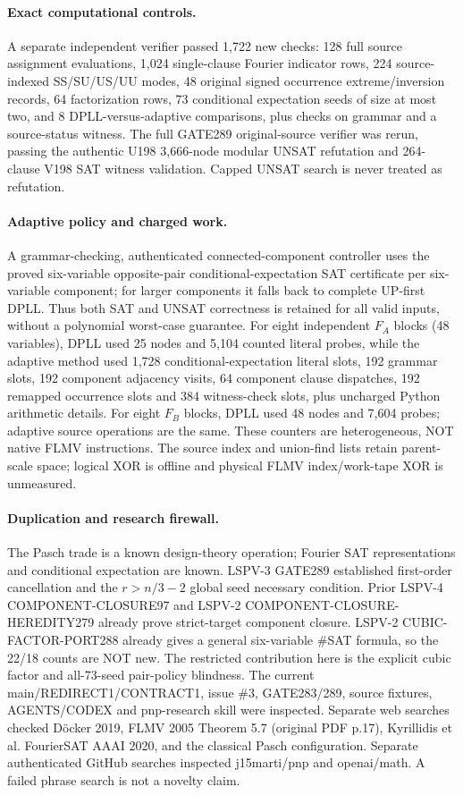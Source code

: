 \documentclass[11pt]{article}
\begin{document}
\paragraph{Exact computational controls.}
A separate independent verifier passed 1,722 new checks: 128 full source assignment evaluations, 1,024 single-clause Fourier indicator rows, 224 source-indexed SS/SU/US/UU modes, 48 original signed occurrence extreme/inversion records, 64 factorization rows, 73 conditional expectation seeds of size at most two, and 8 DPLL-versus-adaptive comparisons, plus checks on grammar and a source-status witness. The full GATE289 original-source verifier was rerun, passing the authentic U198 3,666-node modular UNSAT refutation and 264-clause V198 SAT witness validation. Capped UNSAT search is never treated as refutation.
\paragraph{Adaptive policy and charged work.}
A grammar-checking, authenticated connected-component controller uses the proved six-variable opposite-pair conditional-expectation SAT certificate per six-variable component; for larger components it falls back to complete UP-first DPLL. Thus both SAT and UNSAT correctness is retained for all valid inputs, without a polynomial worst-case guarantee. For eight independent $F_A$ blocks (48 variables), DPLL used 25 nodes and 5,104 counted literal probes, while the adaptive method used 1,728 conditional-expectation literal slots, 192 grammar slots, 192 component adjacency visits, 64 component clause dispatches, 192 remapped occurrence slots and 384 witness-check slots, plus uncharged Python arithmetic details. For eight $F_B$ blocks, DPLL used 48 nodes and 7,604 probes; adaptive source operations are the same. These counters are heterogeneous, NOT native FLMV instructions. The source index and union-find lists retain parent-scale space; logical XOR is offline and physical FLMV index/work-tape XOR is unmeasured.
\paragraph{Duplication and research firewall.}
The Pasch trade is a known design-theory operation; Fourier SAT representations and conditional expectation are known. LSPV-3 GATE289 established first-order cancellation and the $r>n/3-2$ global seed necessary condition. Prior LSPV-4 COMPONENT-CLOSURE97 and LSPV-2 COMPONENT-CLOSURE-HEREDITY279 already prove strict-target component closure. LSPV-2 CUBIC-FACTOR-PORT288 already gives a general six-variable \#SAT formula, so the 22/18 counts are NOT new. The restricted contribution here is the explicit cubic factor and all-73-seed pair-policy blindness. The current main/REDIRECT1/CONTRACT1, issue \#3, GATE283/289, source fixtures, AGENTS/CODEX and pnp-research skill were inspected. Separate web searches checked D\"ocker 2019, FLMV 2005 Theorem 5.7 (original PDF p.17), Kyrillidis et al. FourierSAT AAAI 2020, and the classical Pasch configuration. Separate authenticated GitHub searches inspected j15marti/pnp and openai/math. A failed phrase search is not a novelty claim.
\end{document}
